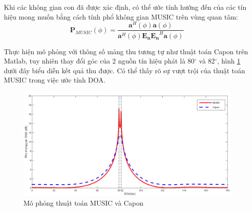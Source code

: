 Khi các không gian con đã được xác định, có thể ước tính hướng đến của các tín hiệu mong muốn bằng cách tính phổ không gian MUSIC trên vùng quan tâm:
\begin{equation}
	\mathbf{P}_{MUSIC}(\phi) = \frac{\mathbf{a}^{H}(\phi)\mathbf{a}(\phi)}{\mathbf{a}^{H}(\phi)\mathbf{E}_{\mathbf{n}}{\mathbf{E}_{\mathbf{n}}}^{H}\mathbf{a}({\phi})}
\end{equation}

Thực hiện mô phỏng với thông số mảng thu tương tự như thuật toán Capon trên Matlab, tuy nhiên thay đổi góc của 2 nguồn tín hiệu phát là 80$^{\circ}$ và 82$^{\circ}$, hình \ref{fig:MUSICvsCapon} dưới đây biểu diễn kết quả thu được. Có thể thấy rõ sự vượt trội của thuật toán MUSIC trong việc ước tính DOA.
\begin{figure} [!htb]
	\centering
	\includegraphics[width=1\linewidth]{figures/MUSICvsCapon.png}
	\caption{Mô phỏng thuật toán MUSIC và Capon}
	\label{fig:MUSICvsCapon}
\end{figure}
